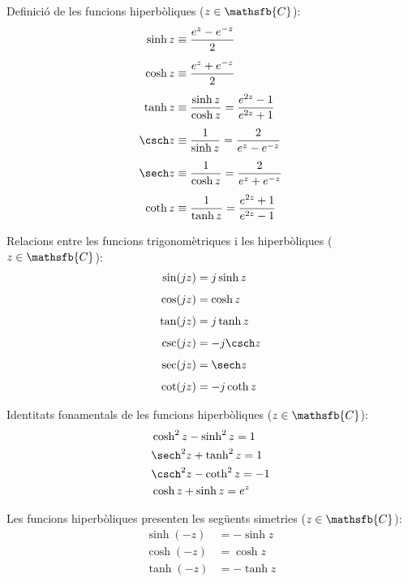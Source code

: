 Definició de les funcions hiperbòliques ($z\in\mathsfb{C}$):
\begin{subequations}
\begin{align}
    \sinh z&\equiv \frac{e^z - e^{-z}}{2} \\[1ex]
    \cosh z&\equiv \frac{e^z + e^{-z}}{2} \\[1ex]
    \tanh z&\equiv \frac{\sinh z}{\cosh z} = \frac{e^{2z}-1}{e^{2z}+1} \\[1ex]
    \csch z &\equiv\frac{1}{\sinh z} =
    \frac{2}{e^z - e^{-z}} \\[1ex]
    \sech z &\equiv\frac{1}{\cosh z} =
    \frac{2}{e^z + e^{-z}} \\[1ex]
    \coth z &\equiv\frac{1}{\tanh z} = \frac{e^{2z}+1}{e^{2z}-1}
\end{align}
\end{subequations}

Relacions entre les funcions trigonomètriques i les  hiperbòliques ($z\in\mathsfb{C}$):
\begin{subequations}
	\begin{align}
		\sin (j z) &= j \sinh z \\[1ex] 
		\cos (j z) &= \cosh z \\[1ex] 
		\tan (j z) &= j \tanh z \\[1ex] 
		\csc (j z) &= -j \csch z \\[1ex]
		\sec (j z) &=  \sech z \\[1ex]
		\cot (j z) &= -j \coth z
	\end{align}
\end{subequations}

Identitats fonamentals de les funcions hiperbòliques
($z\in\mathsfb{C}$):
\begin{align}
    &\cosh^2 z - \sinh^2 z = 1 \\
    &\sech^2 z + \tanh^2 z = 1 \\
    &\csch^2 z - \coth^2 z = -1 \\
    &\cosh z + \sinh z = e^z
\end{align}

Les funcions hiperbòliques presenten les següents simetries
($z\in\mathsfb{C}$):
\begin{subequations}
\begin{align}
    \sinh (-z) &= -\sinh z \\
    \cosh (-z) &= \cosh z\\
    \tanh (-z) &= -\tanh z
\end{align}
\end{subequations}

